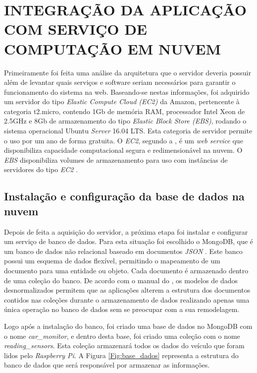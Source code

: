 \section{INTEGRAÇÃO DA APLICAÇÃO COM SERVIÇO DE COMPUTAÇÃO EM NUVEM}
Primeiramente foi feita uma análise da arquitetura que o servidor deveria possuir além de levantar quais serviços e software seriam necessários para garantir o funcionamento do sistema na web. Baseando-se nestas informações, foi adquirido um servidor do tipo \textit{Elastic Compute Cloud (EC2)} da Amazon, pertencente à categoria t2.micro, contendo 1Gb de memória RAM, processador Intel Xeon de 2.5GHz e 8Gb de armazenamento do tipo \textit{Elastic Block Store (EBS)}, rodando o sistema operacional Ubuntu \textit{Server} 16.04 LTS. Esta categoria de servidor permite o uso por um ano de forma gratuita. O \textit{EC2}, segundo a , é um \textit{web service} que disponibiliza capacidade computacional segura e redimensionável na nuvem. O \textit{EBS} disponibiliza volumes de armazenamento para uso com instâncias de servidores do tipo \textit{EC2} \nocite{amazonebs}.

\subsection{\textbf{Instalação e configuração da base de dados na nuvem}}
Depois de feita a aquisição do servidor, a próxima etapa foi instalar e configurar um serviço de banco de dados. Para esta situação foi escolhido o MongoDB, que é um banco de dados não relacional baseado em documentos \textit{JSON} \cite{mongodbwhatis}. Este banco possui um esquema de dados flexível, permitindo o mapeamento de um documento para uma entidade ou objeto. Cada documento é armazenado dentro de uma coleção do banco. De acordo com o manual do , os modelos de dados desnormalizados permitem que as aplicações alterem a estrutura dos documentos contidos nas coleções durante o armazenamento de dados realizando apenas uma única operação no banco de dados sem se preocupar com a sua remodelagem.

Logo após a instalação do banco, foi criado uma base de dados no MongoDB com o nome \textit{car\_monitor}, e dentro desta base, foi criado uma coleção com o nome \textit{reading\_sensors}. Esta coleção armazenará todos os dados do veículo que foram lidos pelo \textit{Raspberry Pi}. A Figura \ref{Fig:base_dados} representa a estrutura do banco de dados que será responsável por armazenar as informações.

